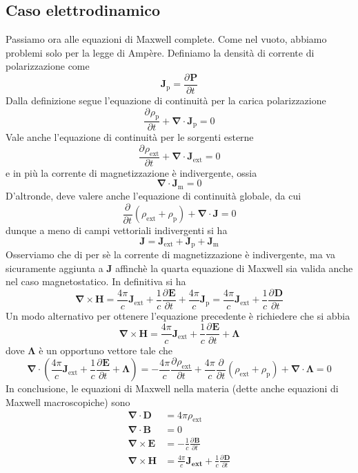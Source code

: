 \documentclass[a4paper,11pt]{book}
\newcommand{\der}[3][]{\frac{\partial ^{#1}#2}{\partial {#3}^{#1}}}
\let\oldnabla\nabla
\renewcommand{\nabla}{\vec{\oldnabla}}
\renewcommand{\vec}[1]{\mathbf{#1}}
\theoremstyle{theorem}
\theoremstyle{definition}
\begin{document}
 \subsection{Caso elettrodinamico}
 Passiamo ora alle equazioni di Maxwell complete. Come nel vuoto, abbiamo problemi solo per la legge di Ampère. Definiamo la densità di corrente di polarizzazione come
 \[\vec{J}_\textrm{p}=\der{\vec{P}}{t}\]
 Dalla definizione segue l'equazione di continuità per la carica polarizzazione
 \[\der{\rho_\textrm{p}}{t}+\nabla\cdot\vec{J}_\textrm{p}=0\]
 Vale anche l'equazione di continuità per le sorgenti esterne
 \[\der{\rho_\textrm{ext}}{t}+\nabla\cdot\vec{J}_\textrm{ext}=0\]
 e in più la corrente di magnetizzazione è indivergente, ossia
 \[\nabla\cdot\vec{J}_\textrm{m}=0\]
 D'altronde, deve valere anche l'equazione di continuità globale, da cui
 \[\der{}{t}(\rho_\textrm{ext}+\rho_\textrm{p})+\nabla\cdot\vec{J}=0\]
 dunque a meno di campi vettoriali indivergenti si ha
 \[\vec{J}=\vec{J}_\textrm{ext}+\vec{J}_\textrm{p}+\vec{J}_\textrm{m}\]
 Osserviamo che di per sè la corrente di magnetizzazione è indivergente, ma va sicuramente aggiunta a $\vec{J}$ affinchè la quarta equazione di Maxwell sia valida anche nel caso magnetostatico. In definitiva si ha
 \[\nabla\times\vec{H}=\frac{4\pi}{c}\vec{J}_\textrm{ext}+\frac{1}{c}\der{\vec{E}}{t}+\frac{4\pi}{c}\vec{J}_\textrm{p}=\frac{4\pi}{c}\vec{J}_\textrm{ext}+\frac{1}{c}\der{\vec{D}}{t}\]
 Un modo alternativo per ottenere l'equazione precedente è richiedere che si abbia
 \[\nabla\times\vec{H}=\frac{4\pi}{c}\vec{J}_\textrm{ext}+\frac{1}{c}\der{\vec{E}}{t}+\vec{\Lambda}\]
 dove $\vec\Lambda$ è un opportuno vettore tale che
 \[\nabla\cdot\left(\frac{4\pi}{c}\vec{J}_\textrm{ext}+\frac{1}{c}\der{\vec{E}}{t}+\vec{\Lambda}\right)=-\frac{4\pi}{c}\der{\rho_\textrm{ext}}{t}+\frac{4\pi}{c}\der{}{t}(\rho_\textrm{ext}+\rho_\textrm{p})+\nabla\cdot\vec{\Lambda}=0\]
 In conclusione, le equazioni di Maxwell nella materia (dette anche equazioni di Maxwell macroscopiche) sono
 \begin{align*}
 	\nabla\cdot\vec{D}&=4\pi\rho_\textrm{ext}\\\nabla\cdot\vec{B}&=0\\\nabla\times\vec{E}&=-\frac{1}{c}\der{\vec{B}}{t}\\\nabla\times\vec{H}&=\frac{4\pi}{c}\vec{J_\textrm{ext}}+\frac{1}{c}\der{\vec{D}}{t}
 \end{align*}
\end{document}
